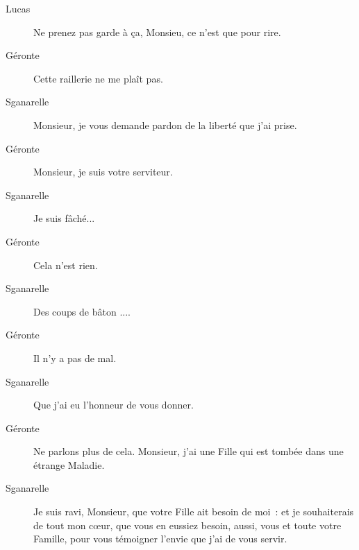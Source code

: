 \documentclass[french,twoside]{book} %
\begin{document}
 \begin{description} \item[Lucas] 

Ne prenez pas garde à ça, Monsieu, ce n’est que pour rire.\end{description}
 \begin{description} \item[Géronte] 

Cette raillerie ne me plaît pas.\end{description}
 \begin{description} \item[Sganarelle] 

Monsieur, je vous demande pardon de la liberté que j’ai prise.\end{description}
 \begin{description} \item[Géronte] 

Monsieur, je suis votre serviteur.\end{description}
 \begin{description} \item[Sganarelle] 

Je suis fâché...\end{description}
 \begin{description} \item[Géronte] 

Cela n’est rien.\end{description}
 \begin{description} \item[Sganarelle] 

Des coups de bâton ....\end{description}
 \begin{description} \item[Géronte] 

Il n’y a pas de mal.\end{description}
 \begin{description} \item[Sganarelle] 

Que j’ai eu l’honneur de vous donner.\end{description}
 \begin{description} \item[Géronte] 

Ne parlons plus de cela. Monsieur, j’ai une Fille qui est tombée dans une étrange Maladie.\end{description}
 \begin{description} \item[Sganarelle] 

Je suis ravi, Monsieur, que votre Fille ait besoin de moi : et je souhaiterais de tout mon cœur, que vous en eussiez besoin, aussi, vous et toute votre Famille, pour vous témoigner l’envie que j’ai de vous servir.\end{description}
\end{document}
